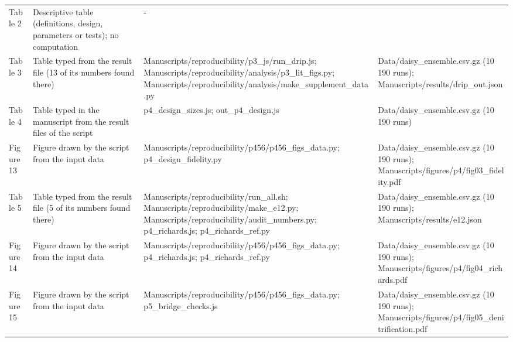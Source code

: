 {\begin{longtable}{p{}p{}p{}p{}}
{}Table 2 & Descriptive table (definitions, design, parameters or tests); no computation & - & \\
{}Table 3 & Table typed from the result file (13 of its numbers found there) & Manuscripts/\allowbreak{}reproducibility/\allowbreak{}p3\_\allowbreak{}js/\allowbreak{}run\_\allowbreak{}drip.js;  Manuscripts/\allowbreak{}reproducibility/\allowbreak{}analysis/\allowbreak{}p3\_\allowbreak{}lit\_\allowbreak{}figs.py;  Manuscripts/\allowbreak{}reproducibility/\allowbreak{}analysis/\allowbreak{}make\_\allowbreak{}supplement\_\allowbreak{}data.py & Data/\allowbreak{}daisy\_\allowbreak{}ensemble.csv.gz (10 190 runs);  Manuscripts/\allowbreak{}results/\allowbreak{}drip\_\allowbreak{}out.json\\
{}Table 4 & Table typed in the manuscript from the result files of the script & p4\_\allowbreak{}design\_\allowbreak{}sizes.js;  out\_\allowbreak{}p4\_\allowbreak{}design.js & Data/\allowbreak{}daisy\_\allowbreak{}ensemble.csv.gz (10 190 runs)\\
{}Figure 13 & Figure drawn by the script from the input data & Manuscripts/\allowbreak{}reproducibility/\allowbreak{}p456/\allowbreak{}p456\_\allowbreak{}figs\_\allowbreak{}data.py;  p4\_\allowbreak{}design\_\allowbreak{}fidelity.py & Data/\allowbreak{}daisy\_\allowbreak{}ensemble.csv.gz (10 190 runs);  Manuscripts/\allowbreak{}figures/\allowbreak{}p4/\allowbreak{}fig03\_\allowbreak{}fidelity.pdf\\
{}Table 5 & Table typed from the result file (5 of its numbers found there) & Manuscripts/\allowbreak{}reproducibility/\allowbreak{}run\_\allowbreak{}all.sh;  Manuscripts/\allowbreak{}reproducibility/\allowbreak{}make\_\allowbreak{}e12.py;  Manuscripts/\allowbreak{}reproducibility/\allowbreak{}audit\_\allowbreak{}numbers.py;  p4\_\allowbreak{}richards.js;  p4\_\allowbreak{}richards\_\allowbreak{}ref.py & Data/\allowbreak{}daisy\_\allowbreak{}ensemble.csv.gz (10 190 runs);  Manuscripts/\allowbreak{}results/\allowbreak{}e12.json\\
{}Figure 14 & Figure drawn by the script from the input data & Manuscripts/\allowbreak{}reproducibility/\allowbreak{}p456/\allowbreak{}p456\_\allowbreak{}figs\_\allowbreak{}data.py;  p4\_\allowbreak{}richards.js;  p4\_\allowbreak{}richards\_\allowbreak{}ref.py & Data/\allowbreak{}daisy\_\allowbreak{}ensemble.csv.gz (10 190 runs);  Manuscripts/\allowbreak{}figures/\allowbreak{}p4/\allowbreak{}fig04\_\allowbreak{}richards.pdf\\
{}Figure 15 & Figure drawn by the script from the input data & Manuscripts/\allowbreak{}reproducibility/\allowbreak{}p456/\allowbreak{}p456\_\allowbreak{}figs\_\allowbreak{}data.py;  p5\_\allowbreak{}bridge\_\allowbreak{}checks.js & Data/\allowbreak{}daisy\_\allowbreak{}ensemble.csv.gz (10 190 runs);  Manuscripts/\allowbreak{}figures/\allowbreak{}p4/\allowbreak{}fig05\_\allowbreak{}denitrification.pdf\\

\end{longtable}}
